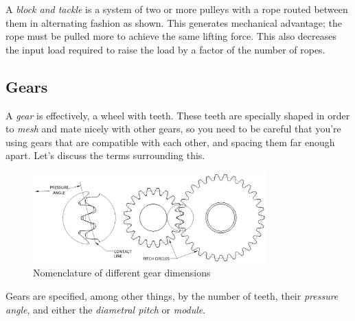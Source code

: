 \documentclass[10pt,letterpaper]{book}
\begin{document}
A \textit{block and tackle} is a system of two or more pulleys with a rope routed between them in alternating fashion as shown. This generates mechanical advantage; the rope must be pulled more to achieve the same lifting force. This also decreases the input load required to raise the load by a factor of the number of ropes. 

\subsection{Gears}

A \textit{gear} is effectively, a wheel with teeth. These teeth are specially shaped in order to \textit{mesh} and mate nicely with other gears, so you need to be careful that you're using gears that are compatible with each other, and spacing them far enough apart. Let's discuss the terms surrounding this.

\begin{figure}[H]
	\includegraphics[width=0.8\textwidth]{imgs/gear_nomenclature.png}
	\caption{Nomenclature of different gear dimensions}
\end{figure}

Gears are specified, among other things, by the number of teeth, their \textit{pressure angle}, and either the \textit{diametral pitch} or \textit{module}.
\end{document}
